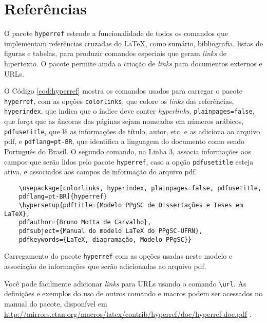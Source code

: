 \chapter{Referências}\label{cap:refs}

O pacote \texttt{hyperref} \parencite{hyperref} estende a funcionalidade de todos os comandos que implementam referências cruzadas do \LaTeX{}, como sumário, bibliografia, listas de figuras e tabelas, para produzir comandos especiais que geram \textit{links} de hipertexto. O pacote permite ainda a criação de \textit{links} para documentos externos e URLs.

O Código \ref{cod:hyperref} mostra os comandos usados para carregar o pacote \texttt{hyperref}, com as opções \texttt{colorlinks}, que colore os \textit{links} das referências, \texttt{hyperindex}, que indica que o índice deve conter \textit{hyperlinks}, \texttt{plainpages=false}, que força que as âncoras das páginas sejam nomeadas em números arábicos,  \texttt{pdfusetitle}, que lê as informações de título, autor, etc. e as adiciona ao arquivo \gls{pdf}, e
\texttt{pdflang=pt-BR}, que identifica a linguagem do documento como sendo Português do Brasil. O segundo comando, na Linha 3, associa informações aos campos que serão lidos pelo pacote \texttt{hyperref}, caso a opção \texttt{pdfusetitle} esteja ativa, e associados aos campos de informação do arquivo \gls{pdf}.

\begin{listing}[ht]
	\begin{verbatim}
	\usepackage[colorlinks, hyperindex, plainpages=false, pdfusetitle, 
	pdflang=pt-BR]{hyperref} 
	\hypersetup{pdftitle={Modelo PPgSC de Dissertações e Teses em LaTeX}, 
	pdfauthor={Bruno Motta de Carvalho}, 
	pdfsubject={Manual do modelo LaTeX do PPgSC-UFRN},
	pdfkeywords={LaTeX, diagramação, Modelo PPgSC}} 
	\end{verbatim}
	\caption{Carregamento do pacote \texttt{hyperref} com as opções usadas neste modelo e associação de informações que serão adicionadas ao arquivo \gls{pdf}.}
	\label{cod:hyperref}
\end{listing}

Você pode facilmente adicionar \textit{links} para URLs usando o comando \texttt{\textbackslash{}url}. As definições e exemplos do uso de outros comando e macros podem ser acessados no manual do pacote, disponível em \url{http://mirrors.ctan.org/macros/latex/contrib/hyperref/doc/hyperref-doc.pdf} \parencite{hyperref}.

